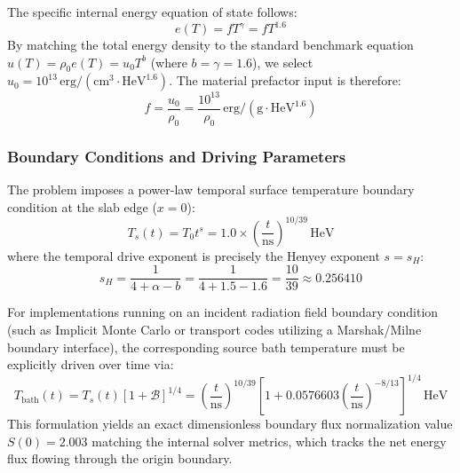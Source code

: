 \documentclass[11pt]{article}
\begin{document}
The specific internal energy equation of state follows:
\begin{equation}
    e(T) = f T^{\gamma} = f T^{1.6}
\end{equation}
By matching the total energy density to the standard benchmark equation $u(T) = \rho_0 e(T) = u_0 T^b$ (where $b = \gamma = 1.6$), we select $u_0 = 10^{13}\,\text{erg}/(\text{cm}^3\cdot\text{HeV}^{1.6})$. The material prefactor input is therefore:
\begin{equation}
    f = \frac{u_0}{\rho_0} = \frac{10^{13}}{\rho_0} \,\text{erg}/(\text{g}\cdot\text{HeV}^{1.6})
\end{equation}

\subsubsection{Boundary Conditions and Driving Parameters}
The problem imposes a power-law temporal surface temperature boundary condition at the slab edge ($x = 0$):
\begin{equation}
    T_s(t) = T_0 t^s = 1.0 \times \left(\frac{t}{\text{ns}}\right)^{10/39} \,\text{HeV}
\end{equation}
where the temporal drive exponent is precisely the Henyey exponent $s = s_H$:
\begin{equation}
    s_H = \frac{1}{4 + \alpha - b} = \frac{1}{4 + 1.5 - 1.6} = \frac{10}{39} \approx 0.256410
\end{equation}

For implementations running on an incident radiation field boundary condition (such as Implicit Monte Carlo or transport codes utilizing a Marshak/Milne boundary interface), the corresponding source bath temperature must be explicitly driven over time via:
\begin{equation}
    T_{\text{bath}}(t) = T_s(t) \left[ 1 + \mathcal{B} \right]^{1/4} = \left(\frac{t}{\text{ns}}\right)^{10/39} \left[ 1 + 0.0576603 \left(\frac{t}{\text{ns}}\right)^{-8/13} \right]^{1/4} \,\text{HeV}
\end{equation}
This formulation yields an exact dimensionless boundary flux normalization value $S(0) = 2.003$ matching the internal solver metrics, which tracks the net energy flux flowing through the origin boundary.
\end{document}
